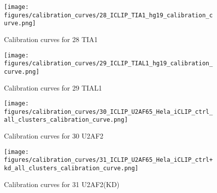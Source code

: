 \documentclass[11pt]{article}
\begin{document}
    
    
    \begin{figure}
        \begin{center}
            \texttt{[image: figures/calibration\_curves/28\_ICLIP\_TIA1\_hg19\_calibration\_curve.png]}
            \caption{Calibration curves for 28 TIA1}
            \label{fig:calibration28 TIA1}
        \end{center}
    \end{figure}

    
    
    \begin{figure}
        \begin{center}
            \texttt{[image: figures/calibration\_curves/29\_ICLIP\_TIAL1\_hg19\_calibration\_curve.png]}
            \caption{Calibration curves for 29 TIAL1}
            \label{fig:calibration29 TIAL1}
        \end{center}
    \end{figure}

    
    
    \begin{figure}
        \begin{center}
            \texttt{[image: figures/calibration\_curves/30\_ICLIP\_U2AF65\_Hela\_iCLIP\_ctrl\_all\_clusters\_calibration\_curve.png]}
            \caption{Calibration curves for 30 U2AF2}
            \label{fig:calibration30 U2AF2}
        \end{center}
    \end{figure}

    
    
    \begin{figure}
        \begin{center}
            \texttt{[image: figures/calibration\_curves/31\_ICLIP\_U2AF65\_Hela\_iCLIP\_ctrl+kd\_all\_clusters\_calibration\_curve.png]}
            \caption{Calibration curves for 31 U2AF2(KD)}
            \label{fig:calibration31 U2AF2(KD)}
        \end{center}
    \end{figure}

    

    
    
    
\end{document}

